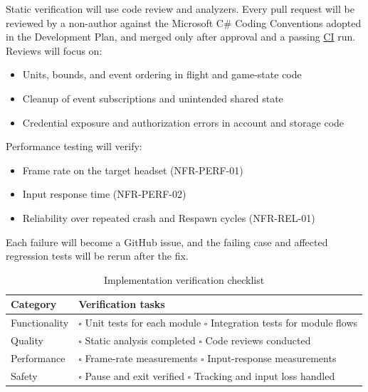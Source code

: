 \documentclass[12pt, titlepage]{article}
\begin{document}
Static verification will use code review and analyzers. Every pull request will be
reviewed by a non-author against the Microsoft C\# Coding Conventions adopted in the
Development Plan, and merged only after approval and a passing \hyperlink{abbr:CI}{CI} run. Reviews will
focus on:

\begin{itemize}
  \item Units, bounds, and event ordering in flight and game-state code
  \item Cleanup of event subscriptions and unintended shared state
  \item Credential exposure and authorization errors in account and storage code
\end{itemize}

Performance testing will verify:

\begin{itemize}
  \item Frame rate on the target headset (NFR-PERF-01)
  \item Input response time (NFR-PERF-02)
  \item Reliability over repeated crash and Respawn cycles (NFR-REL-01)
\end{itemize}

Each failure will become a GitHub issue, and the failing case and affected regression
tests will be rerun after the fix.

\begin{table}[!htbp]
\centering
\caption{Implementation verification checklist}
\label{tab:implementation-checklist}
\renewcommand{\arraystretch}{1.3}
\begin{tabularx}{\textwidth}{@{}>{\raggedright\arraybackslash}p{}>{\raggedright\arraybackslash}X@{}}
\toprule
\textbf{Category} & \textbf{Verification tasks} \\
\midrule
Functionality &
\(\square\) Unit tests for each module\newline
\(\square\) Integration tests for module flows \\
Quality &
\(\square\) Static analysis completed\newline
\(\square\) Code reviews conducted \\
Performance &
\(\square\) Frame-rate measurements\newline
\(\square\) Input-response measurements \\
Safety &
\(\square\) Pause and exit verified\newline
\(\square\) Tracking and input loss handled \\
\bottomrule
\end{tabularx}
\end{table}
\end{document}
